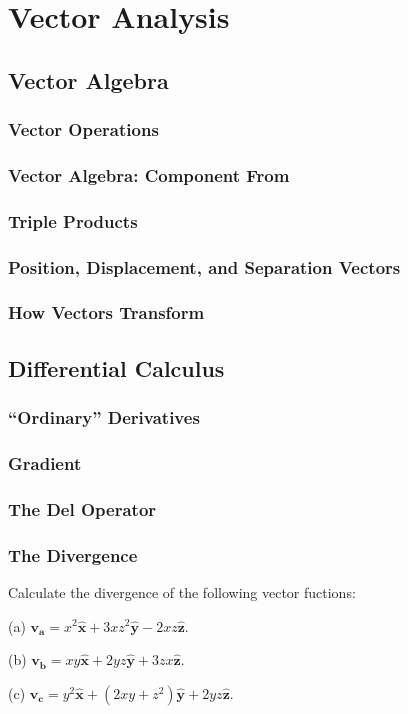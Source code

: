 \chapter{Vector Analysis}

\section{Vector Algebra}
    \subsection{Vector Operations}
    \subsection{Vector Algebra: Component From}
    \subsection{Triple Products}
    \subsection{Position, Displacement, and Separation Vectors}
    \subsection{How Vectors Transform}

\section{Differential Calculus}
    \subsection{``Ordinary'' Derivatives}
    \subsection{Gradient}
    \subsection{The Del Operator}
    \subsection{The Divergence}
        \begin{prob}[1.15]
            Calculate the divergence of the following vector fuctions:

            (a) $\mathbf{v_a}=x^2\mathbf{\hat{x}} + 3xz^2\mathbf{\hat{y}} - 2xz\mathbf{\hat{z}}$.

            (b) $\mathbf{v_b} = xy\mathbf{\hat{x}} + 2yz\mathbf{\hat{y}} + 3zx \mathbf{\hat{z}}$.

            (c) $\mathbf{v_c} = y^2\mathbf{\hat{x}} + (2xy + z^2)\mathbf{\hat{y}} + 2yz\mathbf{\hat{z}}$.
        \end{prob}

